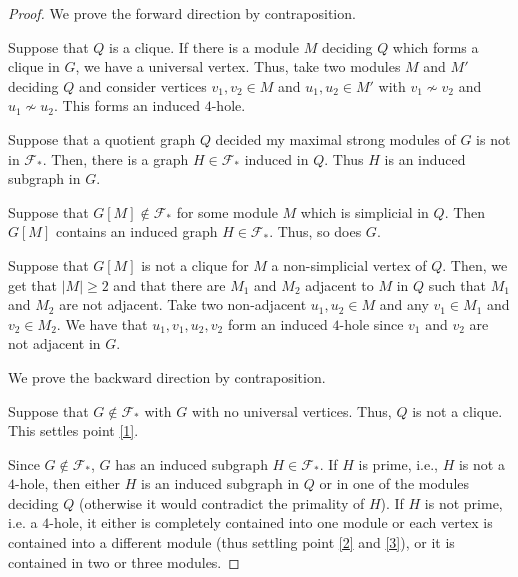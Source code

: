 \documentclass{article}
\begin{document}
    \begin{proof}
        We prove the forward direction by contraposition.
        
        Suppose that $Q$ is a clique. 
        If there is a module $M$ deciding $Q$
        which forms a clique in $G$, we have a universal vertex.
        Thus, take two modules $M$ and $M'$ deciding $Q$ and consider
        vertices $v_1, v_2 \in M$ and  $u_1, u_2 \in M'$ 
        with $v_1 \not \sim v_2$ and $u_1 \not \sim u_2$.
        This forms an induced $4$-hole.

        Suppose that a quotient graph $Q$ decided my maximal strong
        modules of $G$ is not in $\mathcal{F}_{*}$.
        Then, there is a graph $H \in \mathcal{F}_{*}$ induced in $Q$.
        Thus $H$ is an induced subgraph in $G$.

        Suppose that $G[M] \not \in \mathcal{F}_{*}$ for some module $M$ 
        which is simplicial in $Q$. Then $G[M]$ 
        contains an induced graph $H \in \mathcal{F}_{*}$. Thus, so does $G$.

        Suppose that $G\left[M\right]$ is not a clique for $M$ 
        a non-simplicial vertex of $Q$.
        Then, we get that $\left|M\right| \geq 2$ and that
        there are $M_1$ and $M_2$ adjacent to $M$ in $Q$
        such that $M_1$ and $M_2$ are not adjacent.
        Take two non-adjacent $u_1, u_2 \in M$ and
        any $v_1 \in M_1$ and $v_2 \in M_2$.
        We have that $u_1, v_1, u_2, v_2$ form
        an induced $4$-hole since $v_1$ and $v_2$ are
        not adjacent in $G$.
            
        \vspace{5pt}

        We prove the backward direction by contraposition.

        Suppose that $G \not \in \mathcal{F}_{*}$ with $G$ with no universal vertices.
        Thus, $Q$ is not a clique. This settles point \ref{1}.

        Since $G \not \in \mathcal{F}_{*}$, $G$ has an induced subgraph $H \in \mathcal{F}_{*}$.
        If $H$ is prime, i.e., $H$ is not a $4$-hole, 
        then either $H$ is an induced subgraph in $Q$ or in one of the
        modules deciding $Q$ (otherwise it would contradict the primality of $H$).
        If $H$ is not prime, i.e. a  $4$-hole,
        it either is completely
        contained into one module or 
        each vertex is contained into 
        a different module (thus
        settling point \ref{2} and \ref{3}),
        or it is contained in two or three modules.
        

\end{proof}
\end{document}
